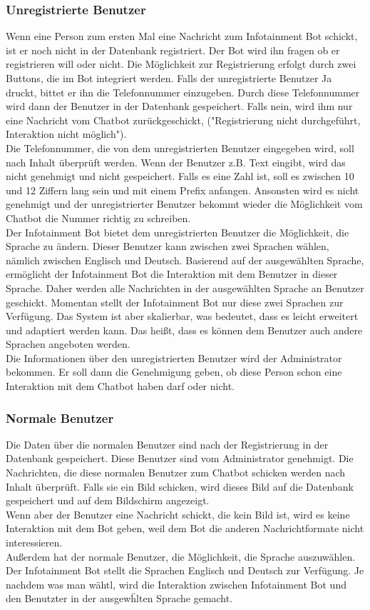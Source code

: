\subsubsection{Unregistrierte Benutzer}
Wenn eine Person zum ersten Mal eine Nachricht zum Infotainment Bot schickt, ist er noch nicht in der Datenbank registriert. Der Bot wird ihn fragen ob er registrieren will oder nicht. Die Möglichkeit zur Registrierung erfolgt durch zwei Buttons, die im Bot integriert werden. Falls der unregistrierte Benutzer Ja druckt, bittet er ihn die Telefonnummer einzugeben. Durch diese Telefonnummer wird dann der Benutzer in der Datenbank gespeichert. Falls nein, wird ihm nur eine Nachricht vom Chatbot zurückgeschickt, ("Registrierung nicht durchgeführt, Interaktion nicht möglich").\\
Die Telefonnummer, die von dem unregistrierten Benutzer eingegeben wird, soll nach Inhalt überprüft werden. Wenn der Benutzer z.B. Text eingibt, wird das nicht genehmigt und nicht gespeichert. Falls es eine Zahl ist, soll es zwischen 10 und 12 Ziffern lang sein und mit einem Prefix anfangen. Ansonsten wird es nicht genehmigt und der unregistrierter Benutzer bekommt wieder die Möglichkeit vom Chatbot die Nummer richtig zu schreiben. \\
Der Infotainment Bot bietet dem unregistrierten Benutzer die M\"oglichkeit, die Sprache zu \"andern. Dieser Benutzer kann zwischen zwei Sprachen w\"ahlen, n\"amlich zwischen Englisch und Deutsch.
Basierend auf der ausgewählten Sprache, erm\"oglicht der Infotainment Bot die Interaktion mit dem Benutzer in dieser Sprache. Daher werden alle Nachrichten in der ausgewählten Sprache an Benutzer geschickt. Momentan stellt der Infotainment Bot nur diese zwei Sprachen zur Verf\"ugung. Das System ist aber skalierbar, was bedeutet, dass es leicht erweitert und adaptiert werden kann. Das hei\ss{}t, dass es k\"onnen dem Benutzer auch andere Sprachen angeboten werden. \\
Die Informationen über den unregistrierten Benutzer wird der Administrator bekommen. Er soll dann die Genehmigung geben, ob diese Person schon eine Interaktion mit dem Chatbot haben darf oder nicht. 
\subsubsection{Normale Benutzer}
Die Daten über die normalen Benutzer sind nach der Registrierung in der Datenbank gespeichert. Diese Benutzer sind vom Administrator genehmigt. Die Nachrichten, die diese normalen Benutzer zum Chatbot schicken werden nach Inhalt überprüft. Falls sie ein Bild schicken, wird dieses Bild auf die Datenbank gespeichert und auf dem Bildschirm angezeigt. \\
Wenn aber der Benutzer eine Nachricht schickt, die kein Bild ist, wird es keine Interaktion mit dem Bot geben, weil dem Bot die anderen Nachrichtformate nicht interessieren. \\
Au\ss{}erdem hat der normale Benutzer, die M\"oglichkeit, die Sprache auszuw\"ahlen. Der Infotainment Bot stellt die Sprachen Englisch und Deutsch zur Verf\"ugung. Je nachdem was man w\"ahtl, wird die Interaktion zwischen Infotainment Bot und den Benutzter in der ausgew\"hlten Sprache gemacht. 

